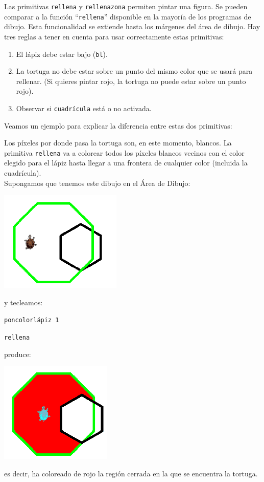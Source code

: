 Las primitivas \texttt{rellena} 
y \texttt{rellenazona} 
permiten pintar una figura. Se pueden comparar a la funci\'on
``\texttt{rellena}'' disponible en la mayor\'ia de los programas
de dibujo. Esta funcionalidad se extiende hasta los m\'argenes del 
\'area de dibujo. Hay tres reglas a tener en cuenta para usar correctamente
estas primitivas:
\begin{enumerate}
   \item El l\'apiz debe estar bajo (\texttt{bl}). 
   \item La tortuga no debe estar sobre un punto del mismo color que se
      usar\'a para rellenar. (Si quieres pintar rojo, la tortuga no puede
      estar sobre un punto rojo).
   \item Observar si \texttt{cuadr\'icula} est\'a o no activada. 
\end{enumerate}
Veamos un ejemplo para explicar la diferencia entre estas dos primitivas:

Los p\'ixeles por donde pasa la tortuga son, en este momento, blancos.
La primitiva \texttt{rellena} va a colorear todos los p\'ixeles blancos
vecinos con el color elegido para el l\'apiz hasta llegar a una frontera
de cualquier color (incluida la cuadr\'icula). \\

\noindent Supongamos que tenemos este dibujo en el \'Area de Dibujo:
\begin{center}
   \includegraphics[scale=0.6]{Imagenes/05_Primitivas/relleno1.png}
\end{center}
\vspace{-0.5cm}
y tecleamos:

\texttt{poncolorl\'apiz 1}

\texttt{rellena}

\noindent produce:
\vspace{-0.75cm}
\begin{center}
   \includegraphics[scale=0.6]{Imagenes/05_Primitivas/relleno2.png}
\end{center}
es decir, ha coloreado de rojo la regi\'on cerrada en la que se encuentra
la tortuga. \\

